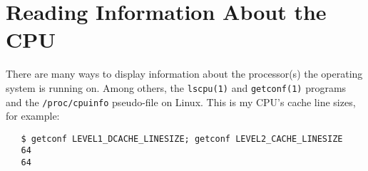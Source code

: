 \section{Reading Information About the CPU}
\label{app:cpuinfo}
There are many ways to display information about the processor(s) the operating system is
running on.  Among others, the \texttt{lscpu(1)} and
\texttt{getconf(1)} programs and the \texttt{/proc/cpuinfo}
pseudo-file on Linux.  This is  my CPU's cache
line sizes, for example:
\begin{verbatim}
   $ getconf LEVEL1_DCACHE_LINESIZE; getconf LEVEL2_CACHE_LINESIZE
   64
   64
\end{verbatim}

